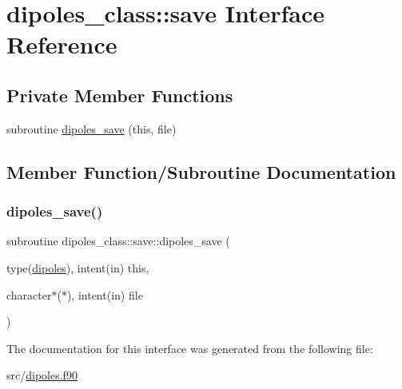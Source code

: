 \hypertarget{interfacedipoles__class_1_1save}{}\section{dipoles\+\_\+class\+:\+:save Interface Reference}
\label{interfacedipoles__class_1_1save}
\subsection*{Private Member Functions}
\begin{DoxyCompactItemize}
\item 
subroutine \hyperlink{interfacedipoles__class_1_1save_a216ba3675b624026222ecd4bb6d83cdb}{dipoles\+\_\+save} (this, file)
\end{DoxyCompactItemize}


\subsection{Member Function/\+Subroutine Documentation}
\mbox{\label{interfacedipoles__class_1_1save_a216ba3675b624026222ecd4bb6d83cdb}} 
\subsubsection{\texorpdfstring{dipoles\+\_\+save()}{dipoles\_save()}}
{\footnotesize\ttfamily subroutine dipoles\+\_\+class\+::save\+::dipoles\+\_\+save (\begin{DoxyParamCaption}\item[{type(\hyperlink{structdipoles__class_1_1dipoles}{dipoles}), intent(in)}]{this,  }\item[{character$\ast$($\ast$), intent(in)}]{file }\end{DoxyParamCaption})\hspace{0.3cm}{\ttfamily [private]}}



The documentation for this interface was generated from the following file\+:\begin{DoxyCompactItemize}
\item 
src/\hyperlink{dipoles_8f90}{dipoles.\+f90}\end{DoxyCompactItemize}
